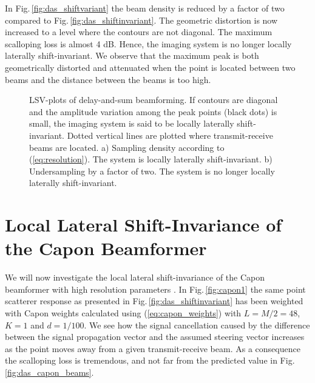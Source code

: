 \documentclass[draftcls]{IEEEtran}
\newcommand{\img}{img/}
\begin{document}
In Fig.\,\ref{fig:das_shiftvariant} the beam density is reduced by a factor of two compared to Fig.\,\ref{fig:das_shiftinvariant}. The geometric distortion is now increased to a level where the contours are not diagonal. The maximum scalloping loss is almost 4 dB. Hence, the imaging system is no longer locally laterally shift-invariant. We observe that the maximum peak is both geometrically distorted and attenuated when the point is located between two beams and the distance between the beams is too high.

\begin{figure}[!t]
\centerline{
\hfill{}
}
\caption{LSV-plots of delay-and-sum beamforming. If contours are diagonal and the amplitude variation among the peak points (black dots) is small, the imaging system is said to be locally laterally shift-invariant. Dotted vertical lines are plotted where transmit-receive beams are located. a) Sampling density according to (\ref{eq:resolution}). The system is locally laterally shift-invariant. b) Undersampling by a factor of two. The system is no longer locally laterally shift-invariant.}
\label{fig:das}
\end{figure}

\section{Local Lateral Shift-Invariance of the Capon Beamformer}\label{sec:capon_LLSI}
We will now investigate the local lateral shift-invariance of the Capon beamformer with high resolution parameters \cite{Synnevag2009, Asen}. In Fig.\,\ref{fig:capon1} the same point scatterer response as presented in Fig.\,\ref{fig:das_shiftinvariant} has been weighted with Capon weights calculated using (\ref{eq:capon_weights}) with $L = M/2 = 48$, $K=1$ and $d=1/100$. We see how the signal cancellation caused by the difference between the signal propagation vector and the assumed steering vector increases as the point moves away from a given transmit-receive beam. As a consequence the scalloping loss is tremendous, and not far from the predicted value in Fig.\,\ref{fig:das_capon_beams}. %
\end{document}
